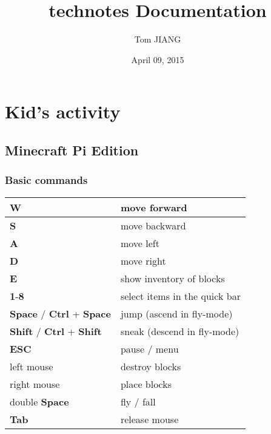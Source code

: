 \documentclass[letterpaper,10pt,english]{sphinxmanual}
\title{technotes Documentation}
\date{April 09, 2015}
\author{Tom JIANG}
\begin{document}
\maketitle
\tableofcontents
{}\label{index::doc}



\chapter{Kid's activity}
\label{index:kid-s-activity}\label{index:technotes-by-tom-jiang-fr-at-http-tom-jiang-fr}

\section{Minecraft Pi Edition}
\label{kid/minecraft::doc}\label{kid/minecraft:minecraft-pi-edition}

\subsection{Basic commands}
\label{kid/minecraft:basic-commands}
\begin{tabulary}{\linewidth}{|L|L|}
\hline

\textbf{W}
 & 
move forward
\\
\hline
\textbf{S}
 & 
move backward
\\
\hline
\textbf{A}
 & 
move left
\\
\hline
\textbf{D}
 & 
move right
\\
\hline
\textbf{E}
 & 
show inventory of blocks
\\
\hline
\textbf{1}-\textbf{8}
 & 
select items in the quick bar
\\
\hline
\textbf{Space} / \textbf{Ctrl} + \textbf{Space}
 & 
jump (ascend in fly-mode)
\\
\hline
\textbf{Shift} / \textbf{Ctrl} + \textbf{Shift}
 & 
sneak (descend in fly-mode)
\\
\hline
\textbf{ESC}
 & 
pause / menu
\\
\hline
left mouse
 & 
destroy blocks
\\
\hline
right mouse
 & 
place blocks
\\
\hline
double \textbf{Space}
 & 
fly / fall
\\
\hline
\textbf{Tab}
 & 
release mouse
\\
\hline\end{tabulary}
\end{document}
